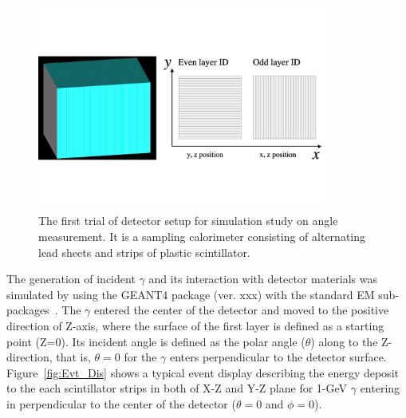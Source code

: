 \documentclass[jkps,preprint,fleqn,showpacs,showkeys]{revtex4}
\begin{document}
\begin{figure}[!hbt]
\includegraphics[width=0.85\textwidth]{figures/Sec2/Prototype_samplingcal.pdf}

\caption{ The first trial of detector setup for simulation study on angle measurement. It is a sampling calorimeter consisting of alternating lead sheets and strips of plastic scintillator. }
\label{fig:det_conf}
\end{figure}

The generation of incident $\gamma$ and its interaction with detector materials was simulated by using the GEANT4 package (ver. xxx) with the standard EM sub-packages~\cite{GEANT4}.
The $\gamma$ entered the center of the detector and moved to the positive direction of Z-axis, where the surface of the first layer is defined as a starting point (Z=0). Its incident angle is defined as the polar angle ($\theta$) along to the Z-direction, that is, $\theta = 0$ for the $\gamma$ enters perpendicular to the detector surface. %
Figure~\ref{fig:Evt_Dis} shows a typical event display describing the energy deposit to the each scintillator strips in both of X-Z and Y-Z plane for 1-GeV $\gamma$ entering in perpendicular to the center of the detector ($\theta=0$ and $\phi=0$).
\end{document}
